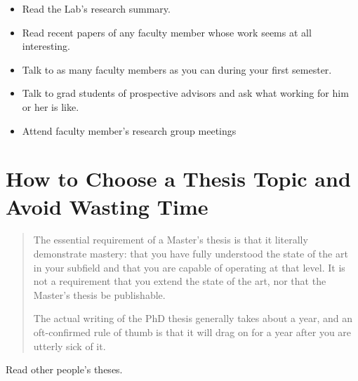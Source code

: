 \begin{itemize}
\item Read the Lab’s research summary. 
\item Read recent papers of any faculty member whose work seems at all interesting.
\item Talk to as many faculty members as you can during your first semester.
\item Talk to grad students of prospective advisors and ask what working for him or her is like. 
\item Attend faculty member's research group meetings
\end{itemize}

\section{How to Choose a Thesis Topic and Avoid Wasting Time}
\blockquote{The essential requirement of a Master’s thesis is that it literally
demonstrate mastery: that you have fully understood the state of the art in your
subfield and that you are capable of operating at that level. It is not a
requirement that you extend the state of the art, nor that the Master’s thesis
be publishable.

The actual writing of the PhD thesis generally takes about a year, and an
oft-confirmed rule of thumb is that it will drag on for a year after you are
utterly sick of it.
}

Read other people's theses.

